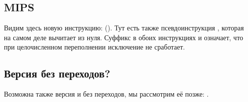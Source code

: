 
\fi

\ifdefined\IncludeMIPS
\subsection{MIPS}



Видим здесь новую инструкцию:  ().
Тут есть также псевдоинструкция , которая на самом деле вычитает из нуля.
Суффикс  в обоих инструкциях  и  означает, что при целочисленном переполнении исключение не
сработает.

\fi

\subsection{Версия без переходов?}

Возможна также версия и без переходов, мы рассмотрим её позже: .
